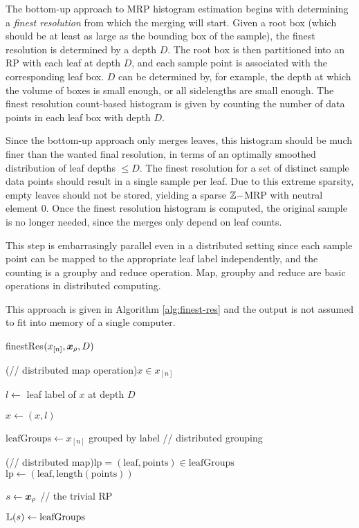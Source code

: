 \documentclass[../merging.tex]{subfiles}
\begin{document}
  The bottom-up approach to MRP histogram estimation begins with
  determining a \textit{finest resolution} from which the merging will start.
  Given a root box (which should be at least as large as the bounding box of the sample),
  the finest resolution is determined by a depth $D$.
  The root box is then partitioned into an RP with each leaf at depth $D$,
  and each sample point is associated with the corresponding leaf box.
  $D$ can be determined by, for example, the depth at which the volume of boxes is small enough,
  or all sidelengths are small enough.
  The finest resolution count-based histogram 
  is given by counting the number of data points in each leaf box with depth $D$.

  Since the bottom-up approach only merges leaves,
  this histogram should be much finer than the wanted final resolution, 
  in terms of an optimally smoothed distribution of leaf depths $\leq D$.
  The finest resolution for a set of distinct sample data points
  should result in a single sample per leaf.
  Due to this extreme sparsity, empty leaves should not be stored,
  yielding a sparse $\mathbb{Z}-$MRP with neutral element 0.
  Once the finest resolution histogram is computed,
  the original sample is no longer needed,
  since the merges only depend on leaf counts.

  This step is embarrasingly parallel even in a distributed setting since
  each sample point can be mapped to the appropriate leaf label independently,
  and the counting is a groupby and reduce operation.
  Map, groupby and reduce are basic operations in distributed computing.

  This approach is given in Algorithm \ref{alg:finest-res}
  and the output is not assumed to fit into memory of a single computer.

  \begin{algorithm}
    \caption{finestRes$(x_{[n]}, \x_\rho, D)$}
    \label{alg:finest-res}
    \ForEach(// distributed map operation){$ x \in x_{[n]} $}{
      $l \gets $ leaf label of $x$ at depth $D$

      $x \gets (x, l)$
    }

    $\mathrm{leafGroups} \gets x_{[n]}$ grouped by label // distributed grouping

    \ForEach(// distributed map){$\mathrm{lp} = (\mathrm{leaf}, \mathrm{points}) \in \mathrm{leafGroups}$}{
      $\mathrm{lp} \gets (\mathrm{leaf}, \mathrm{length}(\mathrm{points}))$
    }

    $s \gets \x_\rho$ // the trivial RP

    $\mathbb{L}(s) \gets \mathrm{leafGroups}$

  \end{algorithm}
\end{document}
